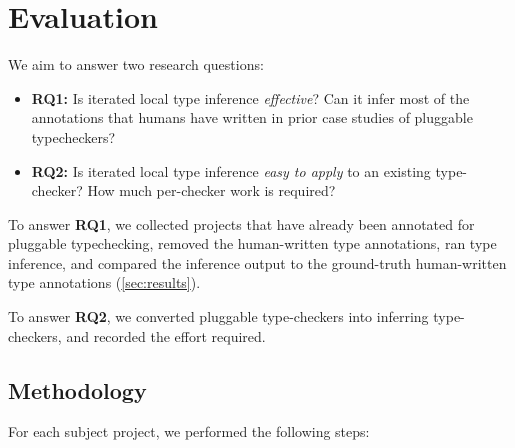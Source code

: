\section{Evaluation}
\label{sec:evaluation}

We aim to answer two research questions:
\begin{itemize}
\item \textbf{RQ1:} Is iterated local type inference \emph{effective}?  Can it infer most of the
  annotations that humans have written in prior case studies of pluggable typecheckers?
\item \textbf{RQ2:} Is iterated local type inference \emph{easy to apply}
  to an existing type-checker?  How much per-checker work is required?
\end{itemize}





To answer \textbf{RQ1}, we collected
projects that have already been annotated for pluggable typechecking,
removed the human-written type annotations,
ran type inference,
and compared the inference output to the
ground-truth human-written type annotations (\cref{sec:results}).

To answer \textbf{RQ2}, we converted \numTypeSystems pluggable
type-checkers into inferring type-checkers, and recorded the effort required.


\subsection{Methodology}
\label{sec:methodology}

For each subject project, we performed the following steps:

